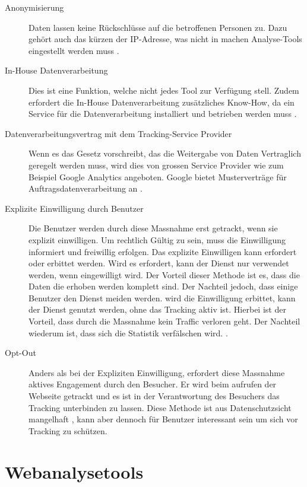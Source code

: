 \begin{description}
  \item[Anonymisierung] Daten lassen keine Rückschlüsse auf die betroffenen Personen zu. Dazu gehört auch das kürzen der IP-Adresse, was nicht in machen Analyse-Tools eingestellt werden muss \parencite[S. 3]{EcommerceUndDatenschutz}.
  \item[In-House Datenverarbeitung] Dies ist eine Funktion, welche nicht jedes Tool zur Verfügung stell. Zudem erfordert die In-House Datenverarbeitung zusätzliches Know-How, da ein Service für die Datenverarbeitung installiert und betrieben werden muss \parencite[S. 175]{nakatani2011toolselectionmethod}. 
  \item[Datenverarbeitungsvertrag mit dem Tracking-Service Provider] Wenn es das Gesetz vorschreibt, das die Weitergabe von Daten Vertraglich geregelt werden muss, wird dies von grossen Service Provider wie zum Beispiel Google Analytics angeboten. Google bietet Musterverträge für Auftragsdatenverarbeitung an \parencite[S. 5]{EcommerceUndDatenschutz}. 
  \item[Explizite Einwilligung durch Benutzer] Die Benutzer werden durch diese Massnahme erst getrackt, wenn sie explizit einwilligen. Um rechtlich Gültig zu sein, muss die Einwilligung informiert und freiwillig erfolgen. Das explizite Einwilligen kann erfordert oder erbittet werden. Wird es erfordert, kann der Dienst nur verwendet werden, wenn eingewilligt wird. Der Vorteil dieser Methode ist es, dass die Daten die erhoben werden komplett sind. Der Nachteil jedoch, dass einige Benutzer den Dienst meiden werden. wird die Einwilligung erbittet, kann der Dienst genutzt werden, ohne das Tracking aktiv ist. Hierbei ist der Vorteil, dass durch die Massnahme kein Traffic verloren geht. Der Nachteil wiederum ist, dass sich die Statistik verfälschen wird. \parencite[S. 2-3]{EcommerceUndDatenschutz}.
  \item[Opt-Out] Anders als bei der Expliziten Einwilligung, erfordert diese Massnahme aktives Engagement durch den Besucher. Er wird beim aufrufen der Webseite getrackt und es ist in der Verantwortung des Besuchers das Tracking unterbinden zu lassen. Diese Methode ist aus Datenschutzsicht mangelhaft \parencite[§§ 9 Abs. 4]{DSSGBERN}, kann aber dennoch für Benutzer interessant sein um sich vor Tracking zu schützen.
\end{description}

\newpage

\section{Webanalysetools}

